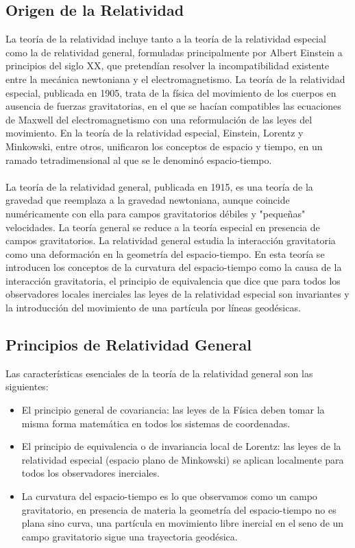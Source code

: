 \subsection{Origen de la Relatividad}
La teoría de la relatividad incluye tanto a la teoría de la relatividad especial como la de relatividad general, formuladas principalmente por Albert Einstein a principios del siglo XX, que pretendían resolver la incompatibilidad existente entre la mecánica newtoniana y el electromagnetismo. La teoría de la relatividad especial, publicada en 1905, trata de la física del movimiento de los cuerpos en ausencia de fuerzas gravitatorias, en el que se hacían compatibles las ecuaciones de Maxwell del electromagnetismo con una reformulación de las leyes del movimiento. En la teoría de la relatividad especial, Einstein, Lorentz y Minkowski, entre otros, unificaron los conceptos de espacio y tiempo, en un ramado tetradimensional al que se le denominó espacio-tiempo.\\\\
La teoría de la relatividad general, publicada en 1915, es una teoría de la gravedad que reemplaza a la gravedad newtoniana, aunque coincide numéricamente con ella para campos gravitatorios débiles y "pequeñas" velocidades. La teoría general se reduce a la teoría especial en presencia de campos gravitatorios. La relatividad general estudia la interacción gravitatoria como una deformación en la geometría del espacio-tiempo. En esta teoría se introducen los conceptos de la curvatura del espacio-tiempo como la causa de la interacción gravitatoria, el principio de equivalencia que dice que para todos los observadores locales inerciales las leyes de la relatividad especial son invariantes y la introducción del movimiento de una partícula por líneas geodésicas.
\subsection{Principios de Relatividad General}
Las características esenciales de la teoría de la relatividad general son las siguientes:
\begin{itemize}
    \item El principio general de covariancia: las leyes de la Física deben tomar la misma forma matemática en todos los sistemas de coordenadas.
    \item El principio de equivalencia o de invariancia local de Lorentz: las leyes de la relatividad especial (espacio plano de Minkowski) se aplican localmente para todos los observadores inerciales.
    \item La curvatura del espacio-tiempo es lo que observamos como un campo gravitatorio, en presencia de materia la geometría del espacio-tiempo no es plana sino curva, una partícula en movimiento libre inercial en el seno de un campo gravitatorio sigue una trayectoria geodésica.
\end{itemize}